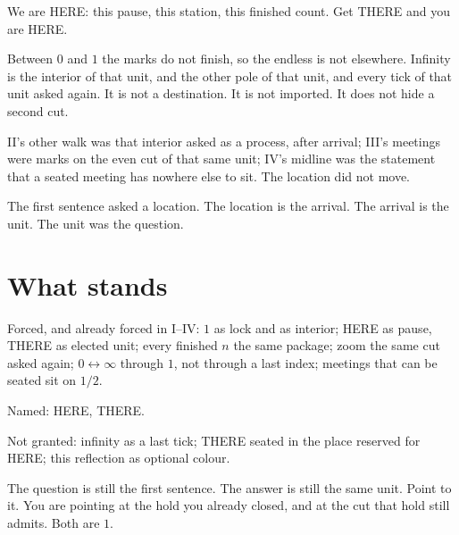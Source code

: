 \documentclass[10pt,a4paper]{article}
\theoremstyle{plain}
\theoremstyle{definition}
\begin{document}
We are HERE: this pause, this station, this finished count.
Get THERE and you are HERE.

Between $0$ and $1$ the marks do not finish, so the endless is not elsewhere.
Infinity is the interior of that unit, and the other pole of that unit, and every tick of that unit asked again.
It is not a destination.
It is not imported.
It does not hide a second cut.

II's other walk was that interior asked as a process, after arrival; III's meetings were marks on the even cut of that same unit; IV's midline was the statement that a seated meeting has nowhere else to sit.
The location did not move.

The first sentence asked a location.
The location is the arrival.
The arrival is the unit.
The unit was the question.

\section{What stands}

Forced, and already forced in I--IV:
$1$ as lock and as interior;
HERE as pause, THERE as elected unit;
every finished $n$ the same package;
zoom the same cut asked again;
$0\leftrightarrow\infty$ through $1$, not through a last index;
meetings that can be seated sit on $1/2$.

Named:
HERE, THERE.

Not granted:
infinity as a last tick;
THERE seated in the place reserved for HERE;
this reflection as optional colour.

The question is still the first sentence.
The answer is still the same unit.
Point to it.
You are pointing at the hold you already closed, and at the cut that hold still admits.
Both are $1$.
\end{document}
